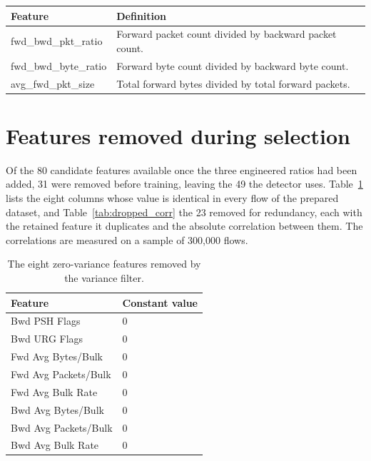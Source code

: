 \noindent\begin{tabularx}{\textwidth}{lX}
  \toprule
  \textbf{Feature} & \textbf{Definition} \\
  \midrule
  fwd\_bwd\_pkt\_ratio  & Forward packet count divided by backward packet count. \\
  fwd\_bwd\_byte\_ratio & Forward byte count divided by backward byte count. \\
  avg\_fwd\_pkt\_size   & Total forward bytes divided by total forward packets. \\
  \bottomrule
\end{tabularx}

\section{Features removed during selection}
\label{app:feat_dropped}

Of the 80 candidate features available once the three engineered ratios had been added, 31 were removed before training, leaving the 49 the detector uses. Table~\ref{tab:dropped_constant} lists the eight columns whose value is identical in every flow of the prepared dataset, and Table~\ref{tab:dropped_corr} the 23 removed for redundancy, each with the retained feature it duplicates and the absolute correlation between them. The correlations are measured on a sample of 300,000 flows.

\begin{table}[H]
  \centering
  \caption{The eight zero-variance features removed by the variance filter.}
  \label{tab:dropped_constant}
  \renewcommand{\arraystretch}{1.25}
\begin{tabularx}{\textwidth}{lX}
  \toprule
  \textbf{Feature} & \textbf{Constant value} \\
  \midrule
  Bwd PSH Flags        & 0 \\
  Bwd URG Flags        & 0 \\
  Fwd Avg Bytes/Bulk   & 0 \\
  Fwd Avg Packets/Bulk & 0 \\
  Fwd Avg Bulk Rate    & 0 \\
  Bwd Avg Bytes/Bulk   & 0 \\
  Bwd Avg Packets/Bulk & 0 \\
  Bwd Avg Bulk Rate    & 0 \\
  \bottomrule
\end{tabularx}
\end{table}

